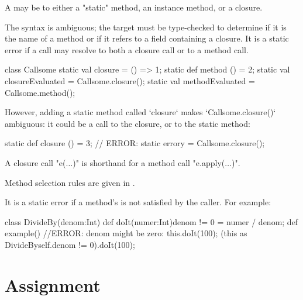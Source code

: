 A  may be to either a \xcd"static" method, an
instance method, or a closure.

The syntax is ambiguous; the target must be type-checked to determine if it is
the name of a method or if it refers to a field containing a closure. It is a
static error if a call may resolve to both a closure call or to a method call.
\begin{xten}
class Callsome {
  static val closure = () => 1;
  static def method () = 2;
  static val closureEvaluated = Callsome.closure();
  static val methodEvaluated = Callsome.method();
}
\end{xten}
%
However, adding a static method called \xcd`closure` makes \xcd`Callsome.closure()`
ambiguous: it could be a call to the closure, or to the static method: 

\begin{xten}
  static def closure () = 3;
  // ERROR: static errory = Callsome.closure();
\end{xten}

A closure call \xcdmath"e($\dots$)" is shorthand for a method call
\xcdmath"e.apply($\dots$)". 

Method selection rules are given in .

It is a static error if a method's  is not satisfied by the
caller.  For example: 
\begin{xten}
class DivideBy(denom:Int) {
  def doIt(numer:Int){denom != 0} = numer / denom;
  def example() {
     //ERROR: denom might be zero: this.doIt(100); 
     (this as DivideBy{self.denom != 0}).doIt(100);
  }
}
\end{xten}
%


\section{Assignment}\label{AssignmentStatement}

